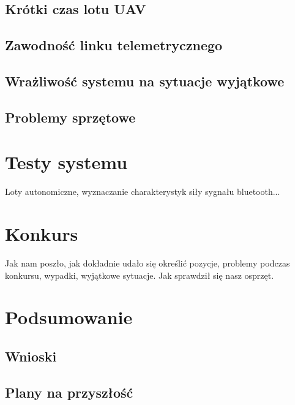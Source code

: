 \subsection{Krótki czas lotu UAV}
\subsection{Zawodność linku telemetrycznego}
\subsection{Wrażliwość systemu na sytuacje wyjątkowe}
\subsection{Problemy sprzętowe}

\section{Testy systemu}
Loty autonomiczne, wyznaczanie charakterystyk siły sygnału bluetooth...

\section{Konkurs}
Jak nam poszło, jak dokładnie udało się określić pozycje, problemy podczas konkursu, wypadki, wyjątkowe sytuacje. Jak sprawdził się nasz osprzęt.

\section{Podsumowanie}
\subsection{Wnioski}
\subsection{Plany na przyszłość}
